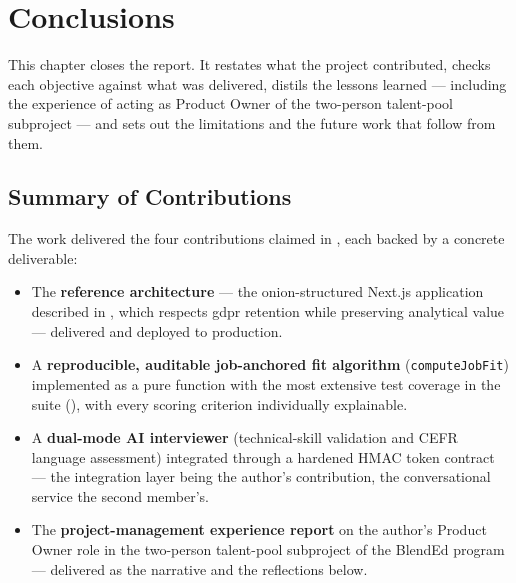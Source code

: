 ﻿\chapter{Conclusions}
\label{cap:conclusions}

This chapter closes the report. It restates what the project contributed,
checks each objective against what was delivered, distils the lessons
learned --- including the experience of acting as Product Owner of the
two-person talent-pool subproject --- and sets out the limitations and the
future work that follow from them.


\section{Summary of Contributions}
\label{sec:concl-summary}

The work delivered the four contributions claimed in
, each backed by a concrete deliverable:

\begin{itemize}
	\item The \textbf{reference architecture} --- the onion-structured Next.js
	application described in , which respects \gls{gdpr}
	retention while preserving analytical value --- delivered and deployed to
	production.
	\item A \textbf{reproducible, auditable job-anchored fit algorithm}
	(\texttt{computeJobFit}) implemented as a pure function with the most
	extensive test coverage in the suite (), with
	every scoring criterion individually explainable.
	\item A \textbf{dual-mode AI interviewer} (technical-skill validation
	and CEFR language assessment) integrated through a hardened HMAC token
	contract --- the integration layer being the author's contribution, the
	conversational service the second member's.
	\item The \textbf{project-management experience report} on the author's
	Product Owner role in the two-person talent-pool subproject of the
	BlendEd program --- delivered as the  narrative and
	the reflections below.
\end{itemize}


